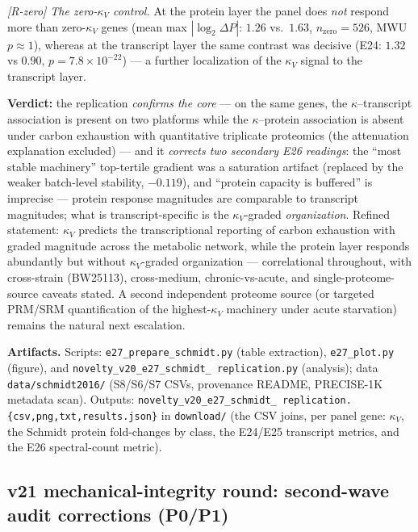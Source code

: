 \documentclass[11pt,a4paper]{article}
\theoremstyle{plain}
\theoremstyle{definition}
\theoremstyle{remark}
\begin{document}
\emph{[R-zero] The zero-$\kappa_V$ control.} At the protein layer
the panel does \emph{not} respond more than zero-$\kappa_V$ genes
(mean max $|\log_2 \Delta P|$: $1.26$ vs.\ $1.63$,
$n_{\mathrm{zero}} = 526$, MWU $p \approx 1$), whereas at the
transcript layer the same contrast was decisive (E24: $1.32$ vs
$0.90$, $p = 7.8 \times 10^{-22}$) --- a further localization of
the $\kappa_V$ signal to the transcript layer.

\textbf{Verdict:} the replication \emph{confirms the core} --- on
the same genes, the $\kappa$--transcript association is present on
two platforms while the $\kappa$--protein association is absent
under carbon exhaustion with quantitative triplicate proteomics
(the attenuation explanation excluded) --- and it \emph{corrects
two secondary E26 readings}: the ``most stable machinery''
top-tertile gradient was a saturation artifact (replaced by the
weaker batch-level stability, $-0.119$), and ``protein capacity is
buffered'' is imprecise --- protein response magnitudes are
comparable to transcript magnitudes; what is transcript-specific
is the $\kappa_V$-graded \emph{organization}. Refined statement:
$\kappa_V$ predicts the transcriptional reporting of carbon
exhaustion with graded magnitude across the metabolic network,
while the protein layer responds abundantly but without
$\kappa_V$-graded organization --- correlational throughout, with
cross-strain (BW25113), cross-medium, chronic-vs-acute, and
single-proteome-source caveats stated. A second independent
proteome source (or targeted PRM/SRM quantification of the
highest-$\kappa_V$ machinery under acute starvation) remains the
natural next escalation.

\textbf{Artifacts.} Scripts: \texttt{e27\_prepare\_schmidt.py}
(table extraction), \texttt{e27\_plot.py} (figure), and
\texttt{novelty\_v20\_e27\_\allowbreak schmidt\_\allowbreak
replication.py} (analysis); data \texttt{data/schmidt2016/}
(S8/S6/S7 CSVs, provenance README, PRECISE-1K metadata scan).
Outputs:
\texttt{novelty\_v20\_e27\_\allowbreak schmidt\_\allowbreak
replication.\{csv,png,txt,results.json\}} in \texttt{download/}
(the CSV joins, per panel gene: $\kappa_V$, the Schmidt protein
fold-changes by class, the E24/E25 transcript metrics, and the
E26 spectral-count metric).

\subsection{v21 mechanical-integrity round: second-wave audit
corrections (P0/P1)}\label{sec:novelty-v21}
\end{document}
